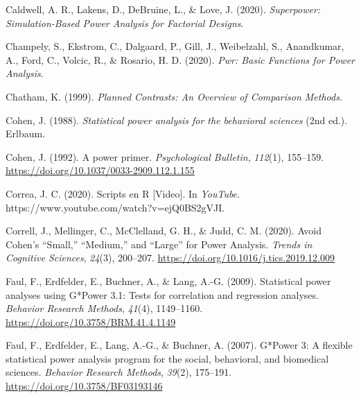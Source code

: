 \documentclass[
]{article}
\newlength{\cslhangindent}
\newlength{\cslentryspacingunit} %
\newenvironment{CSLReferences}[2] %
 {%
  \setlength{\parindent}{0pt}
  \ifodd #1
  \let\oldpar\par
  \def\par{\hangindent=\cslhangindent\oldpar}
  \fi
  \setlength{\parskip}{#2\cslentryspacingunit}
 }%
 {}
\begin{document}
\begin{CSLReferences}{1}{0}
\leavevmode{}%
Caldwell, A. R., Lakens, D., DeBruine, L., \& Love, J. (2020).
\emph{Superpower: {Simulation}-{Based Power Analysis} for {Factorial
Designs}}.

\leavevmode{}%
Champely, S., Ekstrom, C., Dalgaard, P., Gill, J., Weibelzahl, S.,
Anandkumar, A., Ford, C., Volcic, R., \& Rosario, H. D. (2020).
\emph{Pwr: {Basic Functions} for {Power Analysis}}.

\leavevmode{}%
Chatham, K. (1999). \emph{Planned {Contrasts}: {An Overview} of
{Comparison Methods}}.

\leavevmode{}%
Cohen, J. (1988). \emph{Statistical power analysis for the behavioral
sciences} (2nd ed.). {Erlbaum}.

\leavevmode{}%
Cohen, J. (1992). A power primer. \emph{Psychological Bulletin},
\emph{112}(1), 155--159.
\url{https://doi.org/10.1037/0033-2909.112.1.155}

\leavevmode{}%
Correa, J. C. (2020). Scripts en {R} {[}{Video}{]}. In \emph{YouTube}.
https://www.youtube.com/watch?v=ejQ0BS2gVJI.

\leavevmode{}%
Correll, J., Mellinger, C., McClelland, G. H., \& Judd, C. M. (2020).
Avoid {Cohen}'s {``{Small},''} {``{Medium},''} and {``{Large}''} for
{Power Analysis}. \emph{Trends in Cognitive Sciences}, \emph{24}(3),
200--207. \url{https://doi.org/10.1016/j.tics.2019.12.009}

\leavevmode{}%
Faul, F., Erdfelder, E., Buchner, A., \& Lang, A.-G. (2009). Statistical
power analyses using {G}*{Power} 3.1: {Tests} for correlation and
regression analyses. \emph{Behavior Research Methods}, \emph{41}(4),
1149--1160. \url{https://doi.org/10.3758/BRM.41.4.1149}

\leavevmode{}%
Faul, F., Erdfelder, E., Lang, A.-G., \& Buchner, A. (2007). G*{Power}
3: {A} flexible statistical power analysis program for the social,
behavioral, and biomedical sciences. \emph{Behavior Research Methods},
\emph{39}(2), 175--191. \url{https://doi.org/10.3758/BF03193146}


\end{CSLReferences}
\end{document}
